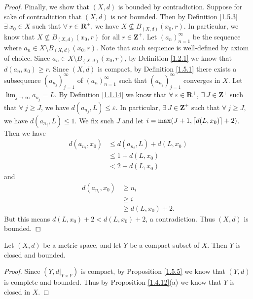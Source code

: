 \begin{proof}
    Finally, we show that \((X, d)\) is bounded by contradiction.
    Suppose for sake of contradiction that \((X, d)\) is not bounded.
    Then by Definition \ref{1.5.3} \(\exists\ x_0 \in X\) such that \(\forall\ r \in \mathbf{R}^+\), we have \(X \not\subseteq B_{(X, d)}(x_0, r)\).
    In particular, we know that \(X \not\subseteq B_{(X, d)}(x_0, r)\) for all \(r \in \mathbf{Z}^+\).
    Let \((a_n)_{n = 1}^\infty\) be the sequence where \(a_n \in X \setminus B_{(X, d)}(x_0, r)\).
    Note that such sequence is well-defined by axiom of choice.
    Since \(a_n \in X \setminus B_{(X, d)}(x_0, r)\), by Definition \ref{1.2.1} we know that \(d(a_n, x_0) \geq r\).
    Since \((X, d)\) is compact, by Definition \ref{1.5.1} there exists a subsequence \((a_{n_j})_{j = 1}^\infty\) of \((a_n)_{n = 1}^\infty\) such that \((a_{n_j})_{j = 1}^\infty\) converges in \(X\).
    Let \(\lim_{j \to \infty} a_{n_j} = L\).
    By Definition \ref{1.1.14} we know that \(\forall\ \varepsilon \in \mathbf{R}^+\), \(\exists\ J \in \mathbf{Z}^+\) such that \(\forall\ j \geq J\), we have \(d(a_{n_j}, L) \leq \varepsilon\).
    In particular, \(\exists\ J \in \mathbf{Z}^+\) such that \(\forall\ j \geq J\), we have \(d(a_{n_j}, L) \leq 1\).
    We fix such \(J\) and let \(i = \max(J + 1, \lceil d(L, x_0)\rceil + 2)\).
    Then we have
    \begin{align*}
        d(a_{n_i}, x_0) & \leq d(a_{n_i}, L) + d(L, x_0) \\
                        & \leq 1 + d(L, x_0)             \\
                        & < 2 + d(L, x_0)
    \end{align*}
    and
    \begin{align*}
        d(a_{n_i}, x_0) & \geq n_i            \\
                        & \geq i              \\
                        & \geq d(L, x_0) + 2.
    \end{align*}
    But this means \(d(L, x_0) + 2 < d(L, x_0) + 2\), a contradiction.
    Thus \((X, d)\) is bounded.
\end{proof}

\begin{corollary}\label{1.5.6}
    Let \((X, d)\) be a metric space, and let \(Y\) be a compact subset of \(X\).
    Then \(Y\) is closed and bounded.
\end{corollary}

\begin{proof}
    Since \((Y, d|_{Y \times Y})\) is compact, by Proposition \ref{1.5.5} we know that \((Y, d)\) is complete and bounded.
    Thus by Proposition \ref{1.4.12}(a) we know that \(Y\) is closed in \(X\).
\end{proof}

